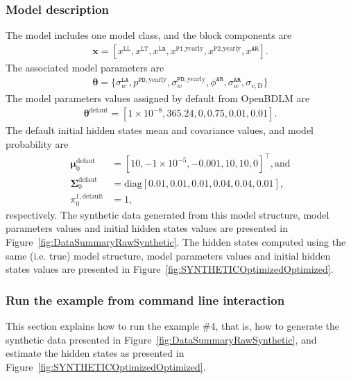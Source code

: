 \subsubsection{Model description}
The model includes one model class, and the block components are 
\begin{gather*}
\textbf{x}=[x^{\mathtt{LL}}, x^{\mathtt{LT}}, x^{\mathtt{La}}, x^{\mathtt{P1}\text{,yearly}}, x^{\mathtt{P2}\text{,yearly}}, x^{\mathtt{AR}}].
\end{gather*}
The associated model parameters are
\begin{gather*}
\bm\theta=\{\sigma_{w}^{\mathtt{LA}}, p^{\mathtt{PD}, \text{yearly}}, \sigma_{w}^{\mathtt{PD}, \text{yearly}}, \phi^{\mathtt{AR}}, \sigma_{w}^{\mathtt{AR}}, \sigma_{v,\text{D}}\} 
 \end{gather*}
The model parameters values assigned by default from OpenBDLM are
\begin{gather*}
\bm\theta^{\text{defaut}}=[ 1\times10^{-8}, 365.24, 0, 0.75, 0.01, 0.01].
\end{gather*}
The default initial hidden states mean and covariance values, and model probability are 
\begin{align*}
\bm \mu^{\text{defaut}}_{0} & = [	 10  , -1\times10^{-5}  ,	-0.001	,	10  ,  	10    ,	0  ]^{\intercal}, \text{and} \\
\bm\Sigma^{\text{defaut}}_{0} & = \text{diag}[ 0.01  ,	0.01  ,	0.01  	,0.04  ,	0.04  ,	0.01 ], \\
 \pi_{0}^{1,\text{default}} & = 1,
 \end{align*}
 respectively.
The synthetic data generated from this model structure, model parameters values and initial hidden states values are presented in Figure~\ref{fig:DataSummaryRawSynthetic}.
The hidden states computed using the same (i.e. true) model structure, model parameters values and initial hidden states values are presented in Figure~\ref{fig:SYNTHETICOptimizedOptimized}.

\subsubsection{Run the example from command line interaction}

This section explains how to run the example \#4, that is, how to generate the synthetic data presented in Figure~\ref{fig:DataSummaryRawSynthetic}, and estimate the hidden states as presented in Figure~\ref{fig:SYNTHETICOptimizedOptimized}.


